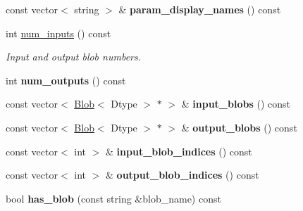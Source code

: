 \begin{DoxyCompactItemize}
\item 
const vector$<$ string $>$ \& {\bfseries param\+\_\+display\+\_\+names} () const \hypertarget{classcaffe_1_1Net_adac592591499d5edae8694df5ba0e396}{}\label{classcaffe_1_1Net_adac592591499d5edae8694df5ba0e396}

\item 
int \hyperlink{classcaffe_1_1Net_ad911f70b3b515dffaff447f994c1662e}{num\+\_\+inputs} () const \hypertarget{classcaffe_1_1Net_ad911f70b3b515dffaff447f994c1662e}{}\label{classcaffe_1_1Net_ad911f70b3b515dffaff447f994c1662e}

\begin{DoxyCompactList}\small\item\em Input and output blob numbers. \end{DoxyCompactList}\item 
int {\bfseries num\+\_\+outputs} () const \hypertarget{classcaffe_1_1Net_af5498b5bcb07fb9aa0f21b37d4204f4b}{}\label{classcaffe_1_1Net_af5498b5bcb07fb9aa0f21b37d4204f4b}

\item 
const vector$<$ \hyperlink{classcaffe_1_1Blob}{Blob}$<$ Dtype $>$ $\ast$ $>$ \& {\bfseries input\+\_\+blobs} () const \hypertarget{classcaffe_1_1Net_a057a709725596200c70b4a4aa34b580a}{}\label{classcaffe_1_1Net_a057a709725596200c70b4a4aa34b580a}

\item 
const vector$<$ \hyperlink{classcaffe_1_1Blob}{Blob}$<$ Dtype $>$ $\ast$ $>$ \& {\bfseries output\+\_\+blobs} () const \hypertarget{classcaffe_1_1Net_a0e28548e849996afdcfb50b9d6fc0862}{}\label{classcaffe_1_1Net_a0e28548e849996afdcfb50b9d6fc0862}

\item 
const vector$<$ int $>$ \& {\bfseries input\+\_\+blob\+\_\+indices} () const \hypertarget{classcaffe_1_1Net_a13c4f3955f256764834a03308308f558}{}\label{classcaffe_1_1Net_a13c4f3955f256764834a03308308f558}

\item 
const vector$<$ int $>$ \& {\bfseries output\+\_\+blob\+\_\+indices} () const \hypertarget{classcaffe_1_1Net_a655b8ceb9757821f2276abf11285d86a}{}\label{classcaffe_1_1Net_a655b8ceb9757821f2276abf11285d86a}

\item 
bool {\bfseries has\+\_\+blob} (const string \&blob\+\_\+name) const \hypertarget{classcaffe_1_1Net_ade24ff5e270657bbeeb35b752300ee7a}{}\label{classcaffe_1_1Net_ade24ff5e270657bbeeb35b752300ee7a}


\end{DoxyCompactItemize}
